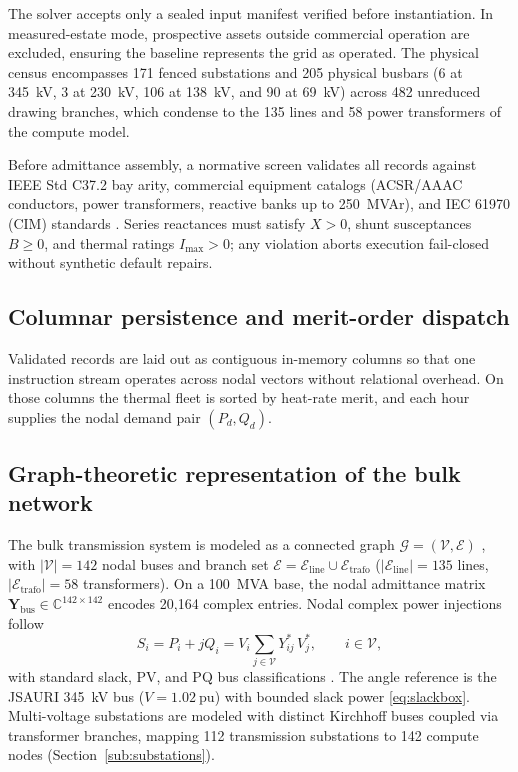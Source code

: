 The solver accepts only a sealed input manifest verified before instantiation. In measured-estate mode, prospective assets outside commercial operation are excluded, ensuring the baseline represents the grid as operated. The physical census encompasses 171 fenced substations and 205 physical busbars (6 at 345~kV, 3 at 230~kV, 106 at 138~kV, and 90 at 69~kV) across 482 unreduced drawing branches, which condense to the 135 lines and 58 power transformers of the compute model.

Before admittance assembly, a normative screen validates all records against IEEE Std C37.2 \cite{ieeec37_2} bay arity, commercial equipment catalogs (ACSR/AAAC conductors, power transformers, reactive banks up to 250~MVAr), and IEC 61970 (CIM) standards \cite{iec61970}. Series reactances must satisfy $X > 0$, shunt susceptances $B \ge 0$, and thermal ratings $I_{\max} > 0$; any violation aborts execution fail-closed without synthetic default repairs.

\subsection{Columnar persistence and merit-order dispatch}
\label{sub:columnar}

Validated records are laid out as contiguous in-memory columns so that one instruction stream operates across nodal vectors without relational overhead. On those columns the thermal fleet is sorted by heat-rate merit, and each hour supplies the nodal demand pair $(P_d, Q_d)$.

\subsection{Graph-theoretic representation of the bulk network}
\label{sub:graph}

The bulk transmission system is modeled as a connected graph $\mathcal{G} = (\mathcal{V}, \mathcal{E})$ \cite{newman2010}, with $|\mathcal{V}| = 142$ nodal buses and branch set $\mathcal{E} = \mathcal{E}_{\mathrm{line}} \cup \mathcal{E}_{\mathrm{trafo}}$ ($|\mathcal{E}_{\mathrm{line}}| = 135$ lines, $|\mathcal{E}_{\mathrm{trafo}}| = 58$ transformers). On a 100~MVA base, the nodal admittance matrix $\mathbf{Y}_{\mathrm{bus}} \in \mathbb{C}^{142 \times 142}$ encodes 20,164 complex entries. Nodal complex power injections follow
\begin{equation}
S_i = P_i + jQ_i = V_i \sum_{j \in \mathcal{V}} Y_{ij}^{*}\, V_j^{*}, \qquad i \in \mathcal{V},
\label{eq:balance}
\end{equation}
with standard slack, PV, and PQ bus classifications \cite{tinney1967}. The angle reference is the JSAURI 345~kV bus ($V = 1.02\ \mathrm{pu}$) with bounded slack power \eqref{eq:slackbox}. Multi-voltage substations are modeled with distinct Kirchhoff buses coupled via transformer branches, mapping 112 transmission substations to 142 compute nodes (Section~\ref{sub:substations}).

